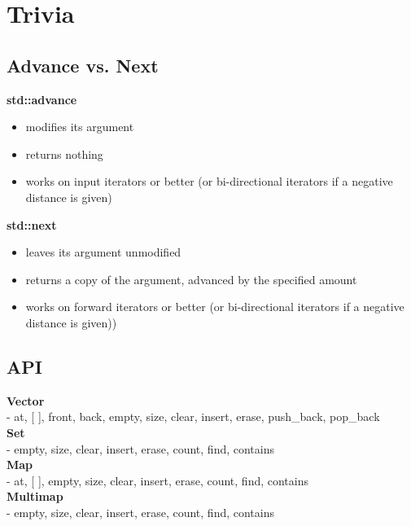 

\newcommand{\SUBJECT}{Zusammenfassung}
\newcommand{\TITLE}{C++}



\lstset{style=cevelop-style}
\section{Trivia}


\subsection{Advance vs. Next}
\textbf{std::advance}

\begin{itemize}
\item modifies its argument
\item returns nothing
\item works on input iterators or better (or bi-directional iterators if a negative distance is given)
\end{itemize}

\noindent\textbf{std::next}

\begin{itemize}
\item leaves its argument unmodified
\item returns a copy of the argument, advanced by the specified amount
\item works on forward iterators or better (or bi-directional iterators if a negative distance is given))
\end{itemize}

\subsection{API}
\textbf{Vector} \\
- at, [ ], front, back, empty, size, clear, insert, erase, push\_back, pop\_back\\
\textbf{Set} \\
- empty, size, clear, insert, erase, count, find, contains\\
\textbf{Map} \\
- at, [ ], empty, size, clear, insert, erase, count, find, contains\\
\textbf{Multimap}\\
- empty, size, clear, insert, erase, count, find, contains



